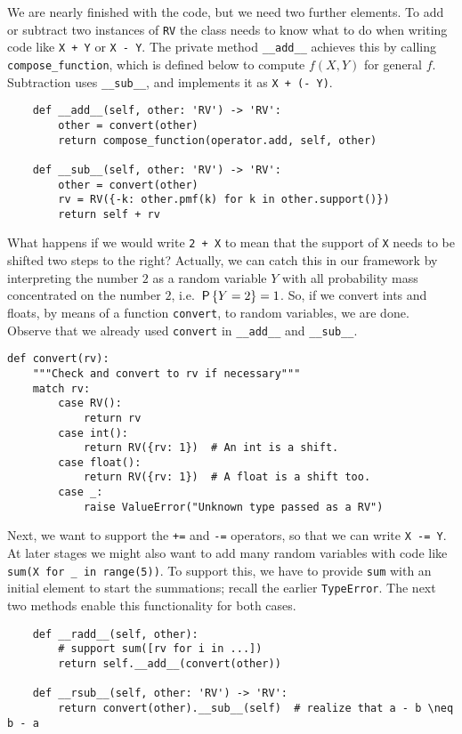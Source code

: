 \documentclass[stochastic-or]{subfiles}
\begin{document}
We are nearly finished with the code, but we need two further elements.
To add or subtract two instances of \texttt{RV} the class needs to know what to do when writing code like \texttt{X + Y} or \texttt{X - Y}.
The private method \texttt{\_\_add\_\_} achieves this by calling \texttt{compose\_function}, which is defined below to compute \(f(X, Y)\) for general \(f\).
Subtraction uses  \texttt{\_\_sub\_\_}, and implements it as \texttt{X + (- Y)}.
\begin{verbatim}
    def __add__(self, other: 'RV') -> 'RV':
        other = convert(other)
        return compose_function(operator.add, self, other)

    def __sub__(self, other: 'RV') -> 'RV':
        other = convert(other)
        rv = RV({-k: other.pmf(k) for k in other.support()})
        return self + rv
\end{verbatim}

What happens if we would write \texttt{2 + X} to mean that the support of \texttt{X} needs to be shifted two steps to the right?
Actually, we can catch this in our framework by interpreting the number \(2\) as a random variable \(Y\) with all probability mass concentrated on the number \(2\), i.e.
\(\P{Y=2} = 1\). So, if we convert ints and floats, by means of a function \texttt{convert}, to random variables,  we are done. Observe that we already used \texttt{convert} in \texttt{\_\_add\_\_} and \texttt{\_\_sub\_\_}.
\begin{verbatim}
def convert(rv):
    """Check and convert to rv if necessary"""
    match rv:
        case RV():
            return rv
        case int():
            return RV({rv: 1})  # An int is a shift.
        case float():
            return RV({rv: 1})  # A float is a shift too.
        case _:
            raise ValueError("Unknown type passed as a RV")
\end{verbatim}


Next, we want to support the \texttt{+=} and \texttt{-=} operators, so that we can write \texttt{X -= Y}.
At later stages we might also want to add many random variables with code like \texttt{sum(X for \_ in range(5))}.
To support this, we have to provide \texttt{sum} with an initial element to start the summations; recall the earlier \texttt{TypeError}.
The next two methods enable this functionality for both cases.

\begin{verbatim}
    def __radd__(self, other):
        # support sum([rv for i in ...])
        return self.__add__(convert(other))

    def __rsub__(self, other: 'RV') -> 'RV':
        return convert(other).__sub__(self)  # realize that a - b \neq b - a
\end{verbatim}
\end{document}
